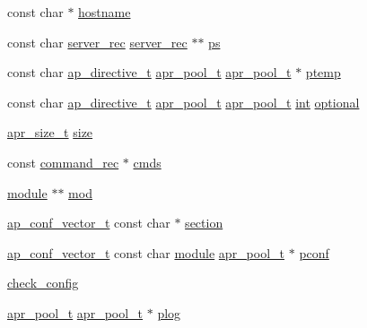 \begin{DoxyCompactItemize}
\item 
const char $\ast$ \hyperlink{group__APACHE__CORE__CONFIG_gaad01339e89106fdf68f57ef118956fa9}{hostname}
\item 
const char \hyperlink{structserver__rec}{server\+\_\+rec} \hyperlink{structserver__rec}{server\+\_\+rec} $\ast$$\ast$ \hyperlink{group__APACHE__CORE__CONFIG_gac3433ab45961daa0aed079830e52d54b}{ps}
\item 
const char \hyperlink{structap__directive__t}{ap\+\_\+directive\+\_\+t} \hyperlink{structapr__pool__t}{apr\+\_\+pool\+\_\+t} \hyperlink{structapr__pool__t}{apr\+\_\+pool\+\_\+t} $\ast$ \hyperlink{group__APACHE__CORE__CONFIG_ga276c3069e6bb618213a277e21f6f269e}{ptemp}
\item 
const char \hyperlink{structap__directive__t}{ap\+\_\+directive\+\_\+t} \hyperlink{structapr__pool__t}{apr\+\_\+pool\+\_\+t} \hyperlink{structapr__pool__t}{apr\+\_\+pool\+\_\+t} \hyperlink{pcre_8txt_a42dfa4ff673c82d8efe7144098fbc198}{int} \hyperlink{group__APACHE__CORE__CONFIG_ga0d991d5aa9b16b953fe82da8f1b09e9a}{optional}
\item 
\hyperlink{group__apr__platform_gaaa72b2253f6f3032cefea5712a27540e}{apr\+\_\+size\+\_\+t} \hyperlink{group__APACHE__CORE__CONFIG_ga2bd3edb50f631a96f1b729fde236ff43}{size}
\item 
const \hyperlink{group__APACHE__CORE__CONFIG_ga79f84e70f072880482a3fd004ae48710}{command\+\_\+rec} $\ast$ \hyperlink{group__APACHE__CORE__CONFIG_ga276fa352432845f2429eef18a78881ec}{cmds}
\item 
\hyperlink{group__APACHE__CORE__CONFIG_ga0ea4f633a5f9f88e1603aaeb1f2b2e69}{module} $\ast$$\ast$ \hyperlink{group__APACHE__CORE__CONFIG_ga6c76cdc81cd99ff0a028e1bda018be59}{mod}
\item 
\hyperlink{group__APACHE__CORE__CONFIG_ga614684670dbf748a70ac6bad272da59c}{ap\+\_\+conf\+\_\+vector\+\_\+t} const char $\ast$ \hyperlink{group__APACHE__CORE__CONFIG_gac0369c4bb36d26aee133c3e3aa6ef563}{section}
\item 
\hyperlink{group__APACHE__CORE__CONFIG_ga614684670dbf748a70ac6bad272da59c}{ap\+\_\+conf\+\_\+vector\+\_\+t} const char \hyperlink{group__APACHE__CORE__CONFIG_ga0ea4f633a5f9f88e1603aaeb1f2b2e69}{module} \hyperlink{structapr__pool__t}{apr\+\_\+pool\+\_\+t} $\ast$ \hyperlink{group__APACHE__CORE__CONFIG_gade454c9a3dc13ac389d15bf30f6c92b2}{pconf}
\item 
\hyperlink{group__APACHE__CORE__CONFIG_ga316c6f6f0fb0da985adf0a1620cc9acc}{check\+\_\+config}
\item 
\hyperlink{structapr__pool__t}{apr\+\_\+pool\+\_\+t} \hyperlink{structapr__pool__t}{apr\+\_\+pool\+\_\+t} $\ast$ \hyperlink{group__APACHE__CORE__CONFIG_gaa034d01ac4c0f083d21feaeae4e9c860}{plog}

\end{DoxyCompactItemize}
